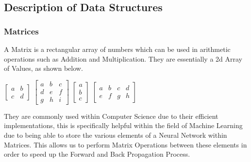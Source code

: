 \begin{flushleft}
                \vspace{0.5cm}
        \subsection{Description of Data Structures}
            \subsubsection{Matrices}
                A Matrix is a rectangular array of numbers which can be used in arithmetic operations such as Addition and Multiplication.
                They are essentially a 2d Array of Values, as shown below. \\
                \begin{center}
                    $\begin{bmatrix}
                        a & b\\
                        c & d
                    \end{bmatrix}$ 
                    $\begin{bmatrix}
                        a & b & c \\
                        d & e & f \\
                        g & h & i 
                    \end{bmatrix}$ 
                    $\begin{bmatrix}
                        a \\
                        b \\
                        c  
                    \end{bmatrix}$ 
                    $\begin{bmatrix}
                        a & b & c & d\\
                        e & f & g & h
                    \end{bmatrix}$ 
                \end{center}    
                They are commonly used within Computer Science due to their efficient implementations, this is specifically helpful
                within the field of Machine Learning due to being able to store the various elements of a Neural Network within Matrices.
                This allows us to perform Matrix Operations between these elements in order to speed up the Forward and Back Propagation 
                Process. \\
                \vspace{0.2cm}

\end{flushleft}
